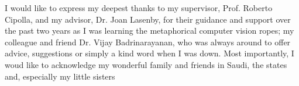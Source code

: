 
\begin{acknowledgements}      


I would like to express my deepest thanks to my supervisor, Prof. Roberto Cipolla, and my advisor, Dr. Joan Lasenby, for their guidance and support over the past two years as I was learning the metaphorical computer vision ropes; my colleague and friend Dr. Vijay Badrinarayanan, who was always around to offer advice, suggestions or simply a kind word when I was down. Most importantly, I woud like to acknowledge my wonderful family and friends in Saudi, the states and, especially my little sisters



\end{acknowledgements}
